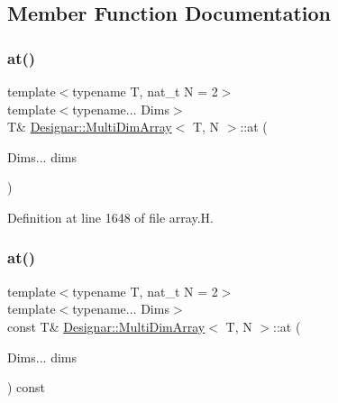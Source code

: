 \subsection{Member Function Documentation}
\mbox{\label{class_designar_1_1_multi_dim_array_a35f5b6b915a03e4ba04ccd28af40dc79}} 
\subsubsection{\texorpdfstring{at()}{at()}\hspace{0.1cm}{\footnotesize\ttfamily [1/2]}}
{\footnotesize\ttfamily template$<$typename T, nat\+\_\+t N = 2$>$ \\
template$<$typename... Dims$>$ \\
T\& \hyperlink{class_designar_1_1_multi_dim_array}{Designar\+::\+Multi\+Dim\+Array}$<$ T, N $>$\+::at (\begin{DoxyParamCaption}\item[{Dims...}]{dims }\end{DoxyParamCaption})\hspace{0.3cm}{\ttfamily [inline]}}



Definition at line 1648 of file array.\+H.

\mbox{\label{class_designar_1_1_multi_dim_array_aa6c5641e0839fae2bc8d1dadc134cc71}} 
\subsubsection{\texorpdfstring{at()}{at()}\hspace{0.1cm}{\footnotesize\ttfamily [2/2]}}
{\footnotesize\ttfamily template$<$typename T, nat\+\_\+t N = 2$>$ \\
template$<$typename... Dims$>$ \\
const T\& \hyperlink{class_designar_1_1_multi_dim_array}{Designar\+::\+Multi\+Dim\+Array}$<$ T, N $>$\+::at (\begin{DoxyParamCaption}\item[{Dims...}]{dims }\end{DoxyParamCaption}) const\hspace{0.3cm}{\ttfamily [inline]}}



